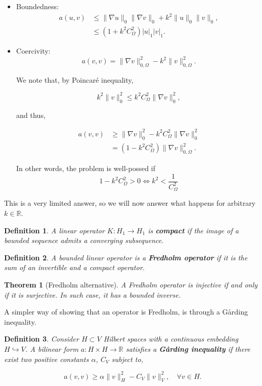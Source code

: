 \documentclass{article}
\newtheorem{definition}{Definition}
\newcommand{\R}{\mathbb{R}}
\newtheorem{theorem}{Theorem}
\begin{document}
\begin{itemize}
    \item Boundedness: 
    \begin{align*}
        a(u,v) &\leq \|\nabla u\|_0\|\nabla v\|_0 + k^2\|u\|_0\|v\|_0,\\ 
        &\leq (1+k^2C_\Omega^2)|u|_1|v|_1.
    \end{align*}

    \item Coercivity: 
    \begin{equation*}
        a(v,v) = \|\nabla v\|^2_{0,\Omega} - k^2\|v\|^2_{0,\Omega}.
    \end{equation*}

    We note that, by Poincaré inequality,

    \[ k^2\|v\|^2_0 \leq k^2 C^2_{\Omega}\|\nabla v\|^2_0, \]

    and thus,

    \begin{align*}
        a(v,v) &\geq \|\nabla v\|^2_0 - k^2C_\Omega^2\|\nabla v\|^2_0 \\
        &= (1- k^2 C_\Omega^2)\|\nabla v\|^2_{0,\Omega}.
    \end{align*}

    In other words, the problem is well-possed if 
    $$1-k^2C_\Omega^2 > 0 \iff k^2 < \frac{1}{C_\Omega^2}$$
\end{itemize}

This is a very limited answer, so we will now answer what happens for arbitrary $k\in\R$.

\begin{definition}
    A linear operator $K:H_1 \to H_1$ is \textbf{compact} if the image of a bounded sequence admits a converging subsequence.
\end{definition}
\begin{definition}
    A bounded linear operator is a \textbf{Fredholm operator} if it is the sum of an invertible and a compact operator. 
\end{definition}

\begin{theorem}[Fredholm alternative]
    A Fredholm operator is injective if and only if it is surjective. In such case, it has a bounded inverse.
\end{theorem}

A simpler way of showing that an operator is Fredholm, is through a Gårding inequality.

\begin{definition}
    Consider $H\subset V$ Hilbert spaces with a continuous embedding $H\hookrightarrow V$. 
    A bilinear form $a:H\times H\to \R$ satisfies a \textbf{Gårding inequality} if there exist two positive constants $\alpha$, $C_V$ subject to, 
    
    \[a(v,v) \geq \alpha \|v\|^2_H - C_V\|v\|^2_V,\quad \forall v\in H.\]
\end{definition}
\end{document}
